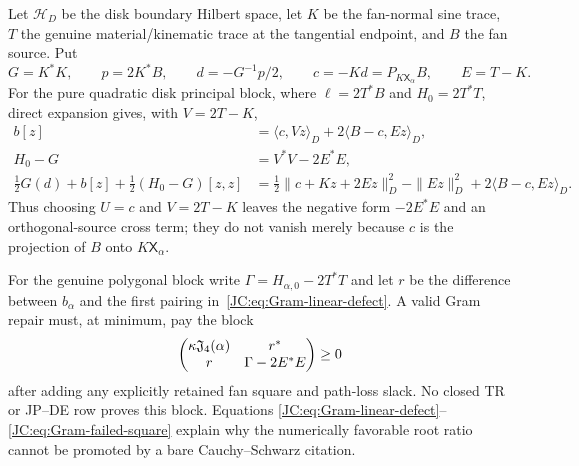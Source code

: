 \begin{remark}
Let $\mathcal H_D$ be the disk boundary Hilbert space, let $K$ be the
fan-normal sine trace, $T$ the genuine material/kinematic trace at the
tangential endpoint, and $B$ the fan source.  Put
\[
 G=K^*K,\qquad p=2K^*B,\qquad
 d=-G^{-1}p/2,\qquad c=-Kd=P_{K\mathsf X_\alpha}B,
 \qquad E=T-K.
\]
For the pure quadratic disk principal block, where
$\ell=2T^*B$ and $H_0=2T^*T$, direct expansion gives, with $V=2T-K$,
\begin{align}
 b[z]&=\langle c,Vz\rangle_D
       +2\langle B-c,Ez\rangle_D,
 \label{JC:eq:Gram-linear-defect}\\
 H_0-G&=V^*V-2E^*E,
 \label{JC:eq:Gram-quadratic-defect}\\
 \frac12G(d)+b[z]+\frac12(H_0-G)[z,z]
 &=\frac12\|c+Kz+2Ez\|_D^2-
   \|Ez\|_D^2+2\langle B-c,Ez\rangle_D.
 \label{JC:eq:Gram-failed-square}
\end{align}
Thus choosing $U=c$ and $V=2T-K$ leaves the negative form $-2E^*E$
and an orthogonal-source cross term; they do not vanish merely because
$c$ is the projection of $B$ onto $K\mathsf X_\alpha$.

For the genuine polygonal block write
$\Gamma=H_{\alpha,0}-2T^*T$ and let $r$ be the difference between
$b_\alpha$ and the first pairing in~\eqref{JC:eq:Gram-linear-defect}.  A
valid Gram repair must, at minimum, pay the block
\[
 \begin{pmatrix}
  \kappa\mathfrak J_4(\alpha) & r^*\\ r & \Gamma-2E^*E
 \end{pmatrix}
 \ge0
\]
after adding any explicitly retained fan square and path-loss slack.
No closed TR or JP--DE row proves this block.  Equations
\eqref{JC:eq:Gram-linear-defect}--\eqref{JC:eq:Gram-failed-square} explain why
the numerically favorable root ratio cannot be promoted by a bare
Cauchy--Schwarz citation.
\end{remark}

